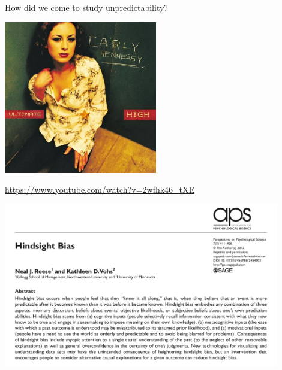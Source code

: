 \documentclass[aspectratio=169]{beamer}
\begin{document}
\begin{frame}

How did we come to study unpredictability?

\end{frame}
\begin{frame}

\begin{center}
  \includegraphics[width = 0.5\textwidth]{figures/hennessy_ultimate_2006_cover}
\end{center}

\vfill

\url{https://www.youtube.com/watch?v=2wfhk46_tXE}

\end{frame}
\begin{frame}

\begin{center}
  \includegraphics[width = 0.9\textwidth]{figures/roese_hindsight_2012_title_abstract}
\end{center}

\end{frame}
\end{document}
